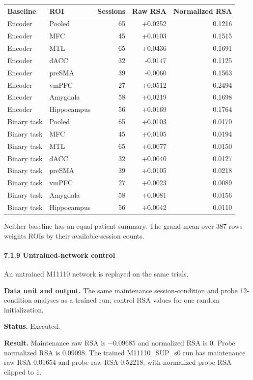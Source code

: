 \documentclass[
  10pt,
]{article}
\begin{document}
\begin{longtable}[]{@{}llrrr@{}}
\toprule\noalign{}
Baseline & ROI & Sessions & Raw RSA & Normalized RSA \\
\midrule\noalign{}
\endhead
\bottomrule\noalign{}
\endlastfoot
Encoder & Pooled & 65 & +0.0252 & 0.1216 \\
Encoder & MFC & 45 & +0.0103 & 0.1515 \\
Encoder & MTL & 65 & +0.0436 & 0.1691 \\
Encoder & dACC & 32 & -0.0147 & 0.1125 \\
Encoder & preSMA & 39 & -0.0060 & 0.1563 \\
Encoder & vmPFC & 27 & +0.0512 & 0.2494 \\
Encoder & Amygdala & 58 & +0.0219 & 0.1698 \\
Encoder & Hippocampus & 56 & +0.0169 & 0.1764 \\
Binary task & Pooled & 65 & +0.0103 & 0.0170 \\
Binary task & MFC & 45 & +0.0105 & 0.0194 \\
Binary task & MTL & 65 & +0.0077 & 0.0150 \\
Binary task & dACC & 32 & +0.0040 & 0.0127 \\
Binary task & preSMA & 39 & +0.0105 & 0.0218 \\
Binary task & vmPFC & 27 & +0.0023 & 0.0089 \\
Binary task & Amygdala & 58 & +0.0081 & 0.0156 \\
Binary task & Hippocampus & 56 & +0.0042 & 0.0110 \\
\end{longtable}

Neither baseline has an equal-patient summary. The grand mean over 387
rows weights ROIs by their available-session counts.

\hypertarget{untrained-network-control}{%
\paragraph{7.1.9 Untrained-network
control}\label{untrained-network-control}}

An untrained M11110 network is replayed on the same trials.

\textbf{Data unit and output.} The same maintenance session-condition
and probe 12-condition analyses as a trained run; control RSA values for
one random initialization.

\textbf{Status.} Executed.

\textbf{Result.} Maintenance raw RSA is \(-0.09685\) and normalized RSA
is 0. Probe normalized RSA is 0.09098. The trained M11110\_SUP\_s0 run
has maintenance raw RSA 0.01654 and probe raw RSA 0.52218, with
normalized probe RSA clipped to 1.
\end{document}
